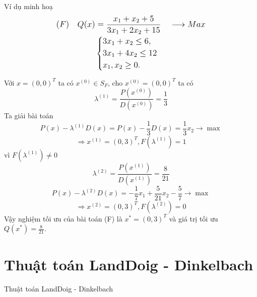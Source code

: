 \documentclass{beamer}
\begin{document}
\begin{frame}{Ví dụ minh hoạ}
\begin{equation} \large \label{F}
    \begin{split}
    (F) \quad Q(x) & = \frac{x_1+x_2+5}{3x_1+2x_2+15} \quad \longrightarrow Max \\
        & \left\{
        \begin{split}
        &3x_1 + x_2 \leq  6, \\
        &3x_1+4x_2 \leq 12 \\
        &x_1, x_2 \geq 0. \\
        \end{split}
        \right.    
    \end{split}
\end{equation}                
\end{frame}

\begin{frame}
Với $x=(0,0)^T$ ta có $x^{(0)} \in S_F$, cho $x^{(0)}=(0,0)^T$ ta có
\begin{equation*}
\lambda^{(1)}=\frac{P(x^{(0)})}{D(x^{(0)})}=\frac{1}{3}
\end{equation*}
Ta giải bài toán
\begin{equation*}
P(x)-\lambda^{(1)}D(x)=P(x)-\frac{1}{3}D(x)=\frac{1}{3}x_2 \rightarrow \max
\end{equation*}
\begin{equation*}
\Rightarrow x^{(1)}=(0,3)^T, F(\lambda^{(1)})=1
\end{equation*}
vì $F(\lambda^{(1)}) \neq 0$
\begin{equation*}
    \lambda^{(2)}=\frac{P(x^{(1)})}{D(x^{(1)})}=\frac{8}{21}
\end{equation*}
\begin{equation*}
    P(x)-\lambda^{(2)}D(x)=-\frac{1}{7}x_1+\frac{5}{21}x_2-\frac{5}{7} \rightarrow \max
\end{equation*}
\begin{equation*}
    \Rightarrow x^{(2)}=(0,3)^T, F(\lambda^{(2)})=0
\end{equation*}
Vậy nghiệm tối ưu của bài toán (F) là $x^*=(0,3)^T$ và giá trị tối ưu $Q(x^*)=\frac{8}{21}$.
\end{frame}

\section{Thuật toán LandDoig - Dinkelbach}
\begin{frame}
   \center 
   \Huge Thuật toán LandDoig - Dinkelbach
\end{frame}
\end{document}

